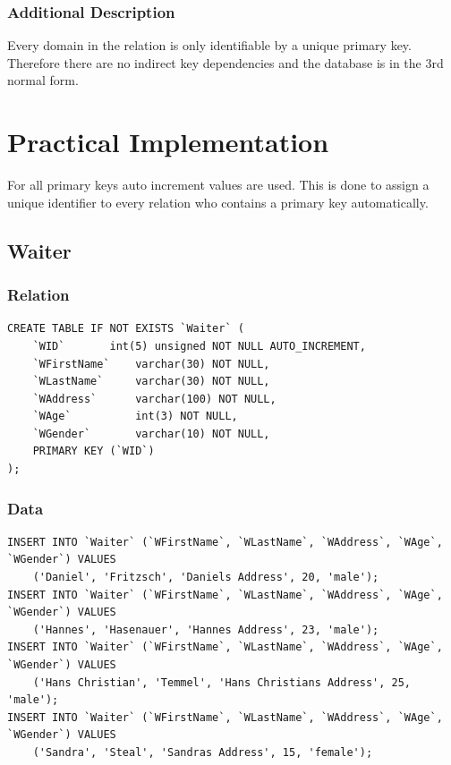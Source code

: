 \documentclass[10pt, a4paper]{article}
\begin{document}
\subsubsection{Additional Description}

Every domain in the relation is only identifiable by a unique primary key. Therefore there are no indirect key dependencies and the database is in the 3rd normal form.

\pagebreak
\section{Practical Implementation}

For all primary keys auto increment values are used. This is done to assign a unique identifier to every relation who contains a primary key automatically.

\subsection{Waiter}

\subsubsection{Relation}

\begin{verbatim}
CREATE TABLE IF NOT EXISTS `Waiter` (
	`WID`		int(5) unsigned NOT NULL AUTO_INCREMENT,
  	`WFirstName` 	varchar(30) NOT NULL,
  	`WLastName`  	varchar(30) NOT NULL,
  	`WAddress`   	varchar(100) NOT NULL,
  	`WAge`       	int(3) NOT NULL,
  	`WGender`    	varchar(10) NOT NULL,
  	PRIMARY KEY (`WID`)
);
\end{verbatim}

\subsubsection{Data}

\begin{verbatim}
INSERT INTO `Waiter` (`WFirstName`, `WLastName`, `WAddress`, `WAge`, `WGender`) VALUES
  	('Daniel', 'Fritzsch', 'Daniels Address', 20, 'male');
INSERT INTO `Waiter` (`WFirstName`, `WLastName`, `WAddress`, `WAge`, `WGender`) VALUES
  	('Hannes', 'Hasenauer', 'Hannes Address', 23, 'male');
INSERT INTO `Waiter` (`WFirstName`, `WLastName`, `WAddress`, `WAge`, `WGender`) VALUES
  	('Hans Christian', 'Temmel', 'Hans Christians Address', 25, 'male');
INSERT INTO `Waiter` (`WFirstName`, `WLastName`, `WAddress`, `WAge`, `WGender`) VALUES
  	('Sandra', 'Steal', 'Sandras Address', 15, 'female');
\end{verbatim}
\end{document}

